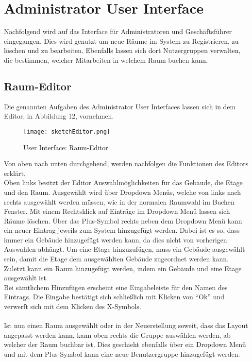 \vspace{5cm}

\section{Administrator User Interface}

Nachfolgend wird auf das Interface für Administratoren und Geschäftsführer eingegangen. 
Dies wird genutzt um neue Räume im System zu Registrieren, zu löschen und zu bearbeiten.
Ebenfalls lassen sich dort Nutzergruppen verwalten, die bestimmen, welcher Mitarbeiten in welchem Raum buchen kann. 

\newpage
\subsection{Raum-Editor}
Die genannten Aufgaben des Administrator User Interfaces lassen sich in dem Editor, in Abbildung 12, vornehmen.

\begin{figure}[!h]
  \centering
  \texttt{[image: sketchEditor.png]}
  \caption{User Interface: Raum-Editor}
  \label{fig:sketch_RaumEditor}
\end{figure}

Von oben nach unten durchgehend, werden nachfolgen die Funktionen des Editors erklärt.
\\
Oben links besitzt der Editor Auswahlmöglichkeiten für das Gebäude, die Etage und den Raum.
Ausgewählt wird über Dropdown Menüs, welche von links nach rechts ausgewählt werden müssen, wie in der normalen Raumwahl im Buchen Fenster.
Mit einem Rechtsklick auf Einträge im Dropdown Menü lassen sich Räume löschen.
Über das Plus-Symbol rechts neben dem Dropdown Menü kann ein neuer Eintrag jeweils zum System hinzugefügt werden.
Dabei ist es so, dass immer ein Gebäude hinzugefügt werden kann, da dies nicht von vorherigen Auswahlen abhängt. 
Um eine Etage hinzuzufügen, muss ein Gebäude ausgewählt sein, damit die Etage dem ausgewählten Gebäude zugeordnet werden kann.
Zuletzt kann ein Raum hinzugefügt werden, indem ein Gebäude und eine Etage ausgewählt ist.
\\
Bei sämtlichem Hinzufügen erscheint eine Eingabeleiste für den Namen des Eintrags.
Die Eingabe bestätigt sich schließlich mit Klicken von "`Ok"' und verwerft sich mit dem Klicken des X-Symbols.

\paragraph{} Ist nun einen Raum ausgewählt oder in der Neuerstellung soweit, dass das Layout angepasst werden kann, kann oben rechts die Gruppe auswählen werden, ab welcher der Raum buchbar ist.
Dies geschieht ebenfalls über ein Dropdown Menü und mit dem Plus-Symbol kann eine neue Benutzergruppe hinzugefügt werden. 

